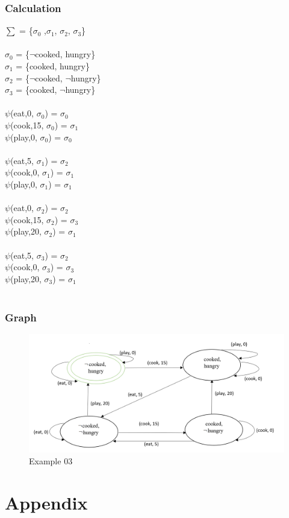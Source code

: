 \documentclass[11pt]{article}
\begin{document}
	\subsubsection{Calculation}\label{par:p303}
	$\sum$ = \{$\sigma_{0}$ ,$\sigma_{1}$, $\sigma_{2}$, $\sigma_{3}$\}\\
	\\
	$\sigma_{0}$ = \{$\neg$cooked, hungry\}\\
	$\sigma_{1}$ = \{cooked, hungry\}\\
	$\sigma_{2}$ = \{$\neg$cooked, $\neg$hungry\}\\
	$\sigma_{3}$ = \{cooked, $\neg$hungry\}\\
	\\
	$\psi$(eat,0, $\sigma_{0}$) = $\sigma_{0}$\\
	$\psi$(cook,15, $\sigma_{0}$) = $\sigma_{1}$\\
	$\psi$(play,0, $\sigma_{0}$) = $\sigma_{0}$\\
	\\
	$\psi$(eat,5, $\sigma_{1}$) = $\sigma_{2}$\\
	$\psi$(cook,0, $\sigma_{1}$) = $\sigma_{1}$\\
	$\psi$(play,0, $\sigma_{1}$) = $\sigma_{1}$\\
	\\
	$\psi$(eat,0, $\sigma_{2}$) = $\sigma_{2}$\\
	$\psi$(cook,15, $\sigma_{2}$) = $\sigma_{3}$\\
	$\psi$(play,20, $\sigma_{2}$) = $\sigma_{1}$\\
	\\
	$\psi$(eat,5, $\sigma_{3}$) = $\sigma_{2}$\\
	$\psi$(cook,0, $\sigma_{3}$) = $\sigma_{3}$\\
	$\psi$(play,20, $\sigma_{3}$) = $\sigma_{1}$\\
	\\
	\subsubsection{Graph}\label{par:p403}
	\begin{figure}[H]
		\includegraphics[width=1\linewidth, height=0.3\textheight]{./media/figure01.png}
		\caption{Example 03}
		\label{Figure:f03}
	\end{figure}
	\newpage
	\section{Appendix}	
	\begin{appendix}
		\listoffigures
		\listoftables
	\end{appendix}
\end{document}
